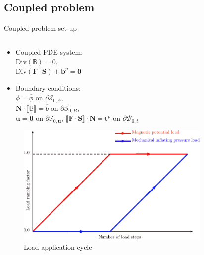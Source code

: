 \documentclass{beamer}
\begin{document}
\subsection{Coupled problem}
\begin{frame}{Coupled problem set up}
\begin{columns}
\begin{column}{0.45\textwidth}
\begin{itemize}
\item Coupled PDE system: \\
$\text{Div}(\mathbb{B}) = 0$, \\
$\text{Div}(\mathbf{F} \cdot \mathbf{S}) + \mathbf{b}^p = \mathbf{0}$
\item Boundary conditions:\\ 
$\phi = \overline{\phi}$ on $\partial \mathcal{S}_{0,\phi}$,\\
$\mathbf{N} \cdot \llbracket \mathbb{B} \rrbracket = \overline{b}$ on $\partial \mathcal{S}_{0,B}$,\\
$\mathbf{u} = \mathbf{0}$ on $\partial \mathcal{S}_{0,\mathbf{u}}$, $ \llbracket \mathbf{F} \cdot \mathbf{S} \rrbracket \cdot \mathbf{N} = \mathbf{t}^p$ on $\partial\mathcal{B}_{0,t}$
\end{itemize}
\begin{figure}[h]
\centering
\includegraphics[width=0.98\textwidth]{load_cycle.pdf}
\caption{Load application cycle}
\end{figure}
\end{column}
\begin{column}{0.54\textwidth}
\begin{figure}[h]
\centering

\end{figure}
\end{column}
\end{columns}
\end{frame}
\end{document}
